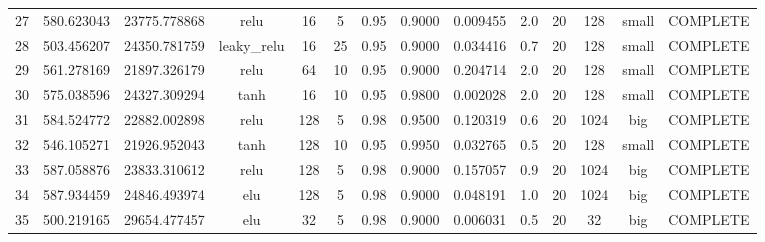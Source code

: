 \begin{longtable}{cccccccccccccc}
                       27 &                 580.623043 &                       23775.778868 &            relu &          16 &              5 &        0.95 & 0.9000 &       0.009455 &             2.0 &                 20 &      128 &     small & COMPLETE \\
                       28 &                 503.456207 &                       24350.781759 &     leaky\_relu &          16 &             25 &        0.95 & 0.9000 &       0.034416 &             0.7 &                 20 &      128 &     small & COMPLETE \\
                       29 &                 561.278169 &                       21897.326179 &            relu &          64 &             10 &        0.95 & 0.9000 &       0.204714 &             2.0 &                 20 &      128 &     small & COMPLETE \\
                       30 &                 575.038596 &                       24327.309294 &            tanh &          16 &             10 &        0.95 & 0.9800 &       0.002028 &             2.0 &                 20 &      128 &     small & COMPLETE \\
                       31 &                 584.524772 &                       22882.002898 &            relu &         128 &              5 &        0.98 & 0.9500 &       0.120319 &             0.6 &                 20 &     1024 &       big & COMPLETE \\
                       32 &                 546.105271 &                       21926.952043 &            tanh &         128 &             10 &        0.95 & 0.9950 &       0.032765 &             0.5 &                 20 &      128 &     small & COMPLETE \\
                       33 &                 587.058876 &                       23833.310612 &            relu &         128 &              5 &        0.98 & 0.9000 &       0.157057 &             0.9 &                 20 &     1024 &       big & COMPLETE \\
                       34 &                 587.934459 &                       24846.493974 &             elu &         128 &              5 &        0.98 & 0.9000 &       0.048191 &             1.0 &                 20 &     1024 &       big & COMPLETE \\
                       35 &                 500.219165 &                       29654.477457 &             elu &          32 &              5 &        0.98 & 0.9000 &       0.006031 &             0.5 &                 20 &       32 &       big & COMPLETE \\

\end{longtable}
